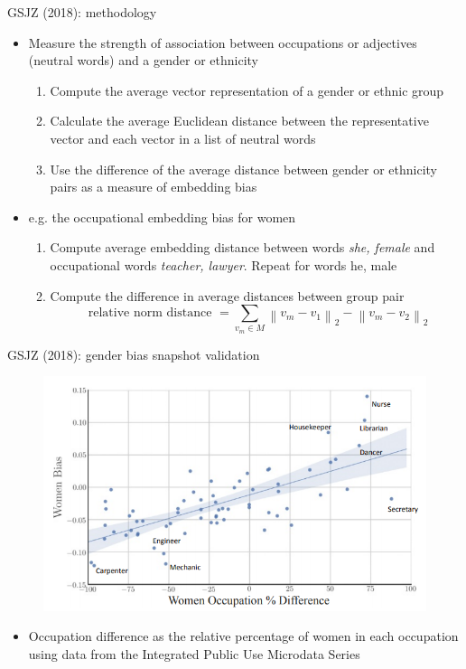 \documentclass[usenames,dvipsnames,english]{beamer}
\begin{document}
\begin{frame}{GSJZ (2018): methodology}
\begin{itemize}
    \setlength{\itemsep}{1.2em}
    \vspace{5pt}
    \item Measure the strength of association between occupations or adjectives (neutral words) and a gender or ethnicity
    \begin{enumerate}
        \setlength{\itemsep}{0.8em}
    \vspace{5pt}
        \item Compute the average vector representation of a gender or ethnic group
        \item Calculate the average Euclidean distance between the representative vector and each vector in a list of neutral words
        \item Use the difference of the average distance between gender or ethnicity pairs as a measure of embedding bias
    \end{enumerate}
    \item e.g. the occupational embedding bias for women
    \begin{enumerate}
        \setlength{\itemsep}{0.8em}
    \vspace{5pt}
        \item Compute average embedding distance between words \textit{she, female} and occupational words \textit{teacher, lawyer}. Repeat for words {he, male}
        \item Compute the difference in average distances between group pair
        $$
        \text { relative norm distance }=\sum_{v_{m} \in M}\left\|v_{m}-v_{1}\right\|_{2}-\left\|v_{m}-v_{2}\right\|_{2}
        $$
    \end{enumerate}
\end{itemize}
\end{frame}
\begin{frame}{GSJZ (2018): gender bias snapshot validation}
\begin{figure}
    \centering
    \includegraphics[scale = 0.5]{Images/gsjz_validation1.png}
    \end{figure}
    \begin{itemize}
        \item {\small Occupation difference as the relative percentage of women in each occupation using data from the Integrated Public Use Microdata Series}
    \end{itemize}
\end{frame}
\end{document}
